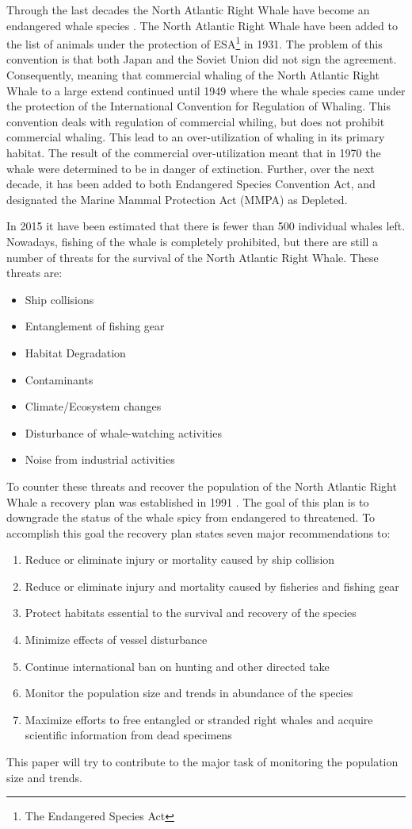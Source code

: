 Through the last decades the North Atlantic Right Whale have become an endangered whale species \cite{NOAA}. The North Atlantic Right Whale have been added to the list of animals under the protection of ESA\footnote{The Endangered Species Act} in 1931. The problem of this convention is that both Japan and the Soviet Union did not sign the agreement. Consequently, meaning that commercial whaling of the North Atlantic Right Whale to a large extend continued until 1949 where the whale species came under the protection of the International Convention for Regulation of Whaling. 
This convention deals with regulation of commercial whiling, but does not prohibit commercial whaling. 
This lead to an over-utilization of whaling in its primary habitat. The result of the commercial over-utilization meant that in 1970 the whale were determined to be in danger of extinction. 
Further, over the next decade, it has been added to both Endangered Species Convention Act, and designated the Marine Mammal Protection Act (MMPA) as Depleted.

In 2015 it have been estimated that there is fewer than 500 individual whales left. Nowadays, fishing of the whale is completely prohibited, but there are still a number of threats for the survival of the North Atlantic Right Whale.
These threats are:
\begin{itemize}
\item Ship collisions 
\item Entanglement of fishing gear
\item Habitat Degradation 
\item Contaminants
\item Climate/Ecosystem changes
\item Disturbance of whale-watching activities
\item Noise from industrial activities
\end{itemize}
To counter these threats and recover the population of the North Atlantic Right Whale a recovery plan was established in 1991 \cite{NOAARecovery}. 
The goal of this plan is to downgrade the status of the whale spicy from endangered to threatened.
To accomplish this goal the recovery plan states seven major recommendations to:
\begin{enumerate}
\item Reduce or eliminate injury or mortality caused by ship collision
\item Reduce or eliminate injury and mortality caused by fisheries and fishing gear
\item Protect habitats essential to the survival and recovery of the species
\item Minimize effects of vessel disturbance
\item Continue international ban on hunting and other directed take
\item Monitor the population size and trends in abundance of the species
\item Maximize efforts to free entangled or stranded right whales and acquire scientific information from dead specimens
\end{enumerate} 
This paper will try to contribute to the major task of monitoring the population size and trends. 

